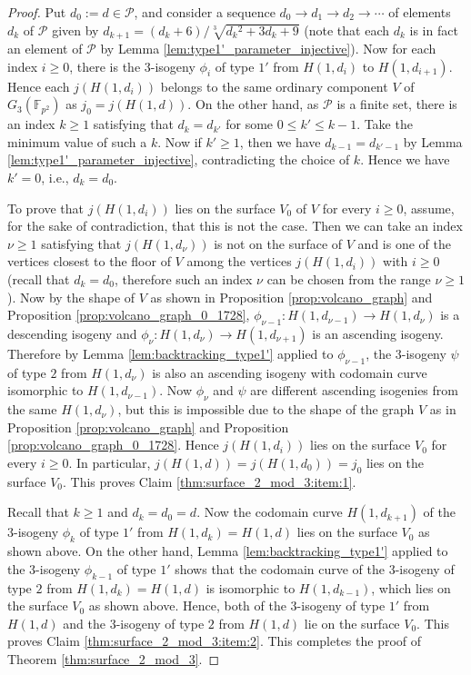 \documentclass{article}
\theoremstyle{definition}
\newcommand{\FF}{\mathbb{F}}
\begin{document}
\begin{proof}
Put $d_0 := d \in \mathcal{P}$, and consider a sequence $d_0 \to d_1 \to d_2 \to \cdots$ of elements $d_k$ of $\mathcal{P}$ given by $d_{k+1} = (d_k + 6) / \sqrt[3]{d_k{}^2 + 3 d_k + 9}$ (note that each $d_k$ is in fact an element of $\mathcal{P}$ by Lemma \ref{lem:type1'_parameter_injective}).
Now for each index $i \geq 0$, there is the $3$-isogeny $\phi_i$ of type $1'$ from $H(1,d_i)$ to $H(1,d_{i+1})$.
Hence each $j(H(1,d_i))$ belongs to the same ordinary component $V$ of $G_3(\FF_{p^2})$ as $j_0 = j(H(1,d))$. 
On the other hand, as $\mathcal{P}$ is a finite set, there is an index $k \geq 1$ satisfying that $d_k = d_{k'}$ for some $0 \leq k' \leq k - 1$.
Take the minimum value of such a $k$.
Now if $k' \geq 1$, then we have $d_{k-1} = d_{k'-1}$ by Lemma \ref{lem:type1'_parameter_injective}, contradicting the choice of $k$.
Hence we have $k' = 0$, i.e., $d_k = d_0$.

To prove that $j(H(1,d_i))$ lies on the surface $V_0$ of $V$ for every $i \geq 0$, assume, for the sake of contradiction, that this is not the case.
Then we can take an index $\nu \geq 1$ satisfying that $j(H(1,d_{\nu}))$ is not on the surface of $V$ and is one of the vertices closest to the floor of $V$ among the vertices $j(H(1,d_i))$ with $i \geq 0$ (recall that $d_k = d_0$, therefore such an index $\nu$ can be chosen from the range $\nu \geq 1$).
Now by the shape of $V$ as shown in Proposition \ref{prop:volcano_graph} and Proposition \ref{prop:volcano_graph_0_1728}, $\phi_{\nu-1} \colon H(1,d_{\nu-1}) \to H(1,d_{\nu})$ is a descending isogeny and $\phi_{\nu} \colon H(1,d_{\nu}) \to H(1,d_{\nu+1})$ is an ascending isogeny.
Therefore by Lemma \ref{lem:backtracking_type1'} applied to $\phi_{\nu-1}$, the $3$-isogeny $\psi$ of type $2$ from $H(1,d_{\nu})$ is also an ascending isogeny with codomain curve isomorphic to $H(1,d_{\nu-1})$.
Now $\phi_{\nu}$ and $\psi$ are different ascending isogenies from the same $H(1,d_{\nu})$, but this is impossible due to the shape of the graph $V$ as in Proposition \ref{prop:volcano_graph} and Proposition \ref{prop:volcano_graph_0_1728}.
Hence $j(H(1,d_i))$ lies on the surface $V_0$ for every $i \geq 0$.
In particular, $j(H(1,d)) = j(H(1,d_0)) = j_0$ lies on the surface $V_0$.
This proves Claim \ref{thm:surface_2_mod_3:item:1}.

Recall that $k \geq 1$ and $d_k = d_0 = d$.
Now the codomain curve $H(1,d_{k+1})$ of the $3$-isogeny $\phi_k$ of type $1'$ from $H(1,d_k) = H(1,d)$ lies on the surface $V_0$ as shown above.
On the other hand, Lemma \ref{lem:backtracking_type1'} applied to the $3$-isogeny $\phi_{k-1}$ of type $1'$ shows that the codomain curve of the $3$-isogeny of type $2$ from $H(1,d_k) = H(1,d)$ is isomorphic to $H(1,d_{k-1})$, which lies on the surface $V_0$ as shown above.
Hence, both of the $3$-isogeny of type $1'$ from $H(1,d)$ and the $3$-isogeny of type $2$ from $H(1,d)$ lie on the surface $V_0$.
This proves Claim \ref{thm:surface_2_mod_3:item:2}.
This completes the proof of Theorem \ref{thm:surface_2_mod_3}.
\end{proof}
\end{document}
